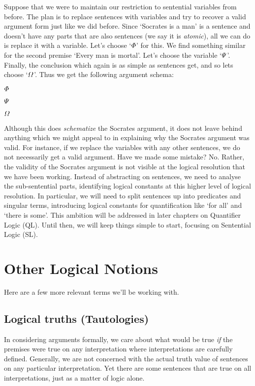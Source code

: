 Suppose that we were to maintain our restriction to sentential variables from before.
The plan is to replace sentences with variables and try to recover a valid argument form just like we did before.
Since `Socrates is a man' is a sentence and doesn't have any parts that are also sentences (we say it is \textit{atomic}), all we can do is replace it with a variable.
Let's choose `$\varPhi{}$' for this. 
We find something similar for the second premise `Every man is mortal'.
Let's choose the variable `$\varPsi{}$'.
Finally, the conclusion which again is as simple as sentences get, and so lets choose `$\varOmega{}$'.
Thus we get the following argument schema:

\begin{earg}
  \item $\varPhi{}$
  \item $\varPsi{}$
  \item[\therefore] $\varOmega{}$
\end{earg}

Although this does \textit{schematize} the Socrates argument, it does not leave behind anything which we might appeal to in explaining why the Socrates argument was valid.
For instance, if we replace the variables with any other sentences, we do not necessarily get a valid argument.
Have we made some mistake?
No.
Rather, the validity of the Socrates argument is not visible at the logical resolution that we have been working.
Instead of abstracting on sentences, we need to analyse the sub-sentential parts, identifying logical constants at this higher level of logical resolution.
In particular, we will need to split sentences up into predicates and singular terms, introducing logical constants for quantification like `for all' and `there is some'.
This ambition will be addressed in later chapters on Quantifier Logic (QL).
Until then, we will keep things simple to start, focusing on Sentential Logic (SL).





\section{Other Logical Notions}

Here are a few more relevant terms we'll be working with.

\subsection{Logical truths (Tautologies)}
\label{sec-tautologydef}
In considering arguments formally, we care about what would be true \emph{if} the premises were true on any interpretation where interpretations are carefully defined. 
Generally, we are not concerned with the actual truth value of sentences on any particular interpretation.
Yet there are some sentences that are true on all interpretations, just as a matter of logic alone.

